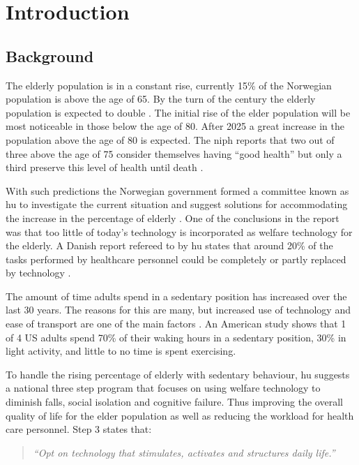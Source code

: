 \chapter{Introduction}

\section{Background}

The elderly population is in a constant rise, currently 15\% of the Norwegian population is above the age of 65. By the turn of the century the elderly population is expected to double \cite{elder}. The initial rise of the elder population will be most noticeable in those below the age of 80. After 2025 a great increase in the population above the age of 80 is expected. The \gls{niph} reports that two out of three above the age of 75 consider themselves having ``good health'' but only a third preserve this level of health until death \cite{elder}.

With such predictions the Norwegian government formed a committee known as \gls{hu} to investigate the current situation and suggest solutions for accommodating the increase in the percentage of elderly \cite{haagen}. One of the conclusions in the report was that too little of today's technology is incorporated as welfare technology for the elderly. A Danish report refereed to by \gls{hu} states that around 20\% of the tasks performed by healthcare personnel could be completely or partly replaced by technology \cite{kmd}.

The amount of time adults spend in a sedentary position has increased over the last 30 years. The reasons for this are many, but increased use of technology and ease of transport are one of the main factors \cite{sedentaryBehaviour}. An American study shows that 1 of 4 US adults spend 70\% of their waking hours in a sedentary position, 30\% in light activity, and little to no time is spent exercising.

To handle the rising percentage of elderly with sedentary behaviour, \gls{hu} suggests a national three step program that focuses on using welfare technology to diminish falls, social isolation and cognitive failure. Thus improving the overall quality of life for the elder population as well as reducing the workload for health care personnel. Step 3 states that:
\begin{quote}
\textit{``Opt on technology that stimulates, activates and structures daily life.''}
\end{quote}
 
